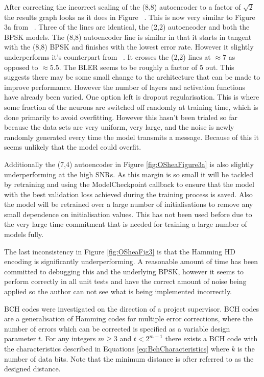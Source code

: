 \documentclass[12pt,onecolumn,letterpaper]{article}
\begin{document}
After correcting the incorrect scaling of the (8,8) autoencoder to a factor of $\sqrt{2}$ the results graph looks as it does in Figure ~\cite{fig:OSheaFigure3b}. This is now very similar to Figure 3a from ~\cite{oShea}. Three of the lines are identical, the (2,2) autoencoder and both the BPSK models. The (8,8) autoencoder line is similar in that it starts in tangent with the (8,8) BPSK and finishes with the lowest error rate. However it slightly underperforms it's counterpart from ~\cite{oShea}. It crosses the (2,2) lines at $\approx7$ as opposed to $\approx5.5$. The BLER seems to be roughly a factor of 5 out. This suggests there may be some small change to the architecture that can be made to improve performance. However the number of layers and activation functions have already been varied. One option left is dropout regularisation. This is where some fraction of the neurons are switched off randomly at training time, which is done primarily to avoid overfitting. However this hasn't been trialed so far because the data sets are very uniform, very large, and the noise is newly randomly generated every time the model transmits a message. Because of this it seems unlikely that the model could overfit. 

Additionally the (7,4) autoencoder in Figure \ref{fig:OSheaFigure3a} is also slightly underperforming at the high SNRs. As this margin is so small it will be tackled by retraining and using the ModelCheckpoint callback to ensure that the model with the best validation loss achieved during the training process is saved. Also the model will be retrained over a large number of initialisations to remove any small dependence on initialisation values. This has not been used before due to the very large time commitment that is needed for training a large number of models fully. 

The last inconsistency in Figure \ref{fig:OSheaFig3} is that the Hamming HD encoding is significantly underperforming. A reasonable amount of time has been committed to debugging this and the underlying BPSK, however it seems to perform correctly in all unit tests and have the correct amount of noise being applied so the author can not see what is being implemented incorrectly. 


BCH codes were investigated on the direction of a project supervisor. BCH codes are a generalisation of Hamming codes for multiple error corrections, where the number of errors which can be corrected is specified as a variable design parameter $t$. For any integers $m \geq 3$ and $t < 2^{m-1}$ there exists a BCH code with the characteristics described in Equations \ref{eq:BchCharacteristics} where $k$ is the number of data bits. Note that the minimum distance is ofter referred to as the designed distance.
\end{document}
